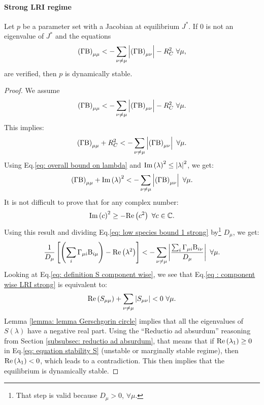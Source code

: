 \documentclass[12pt, titlepage]{report}
\begin{document}
\paragraph{Strong LRI regime}
\begin{theorem}\label{theorem: strong LRI regime}
Let $p$ be a parameter set with a Jacobian at equilibrium $J^*$. If $0$ is not an eigenvalue of $J^*$ and the equations
\begin{equation}
\left(\Gamma \text{B}\right)_{\mu\mu} < - \sum_{\nu \neq \mu } \left|{\left(\Gamma \text{B}\right)_{\mu \nu}}\right| - R_C^2 \ \forall \mu, \label{eq: strong LRI regime}
\end{equation}
are verified, then $p$ is dynamically stable.
\end{theorem}
\begin{proof}
We assume
\begin{equation}
\left(\Gamma \text{B}\right)_{\mu\mu} < - \sum_{\nu \neq \mu } \left|{\left(\Gamma \text{B}\right)_{\mu \nu}}\right| -R_C^2 \ \forall \mu.
\end{equation}
This implies:
\begin{equation}
\left(\Gamma \text{B}\right)_{\mu\mu} + R_C^2< - \sum_{\nu \neq \mu } \left|{\left(\Gamma \text{B}\right)_{\mu \nu}}\right| \ \forall \mu.
\end{equation}
Using Eq.\eqref{eq: overall bound on lambda} and $\text{Im}\left(\lambda\right)^2 \leq \left|{\lambda}\right|^2$, we get:
\begin{equation}
  \left(\Gamma\text{B} \right)_{\mu\mu} + \text{Im}\left(\lambda\right)^2 < - \sum_{\nu \neq \mu } \left|{\left(\Gamma \text{B}\right)_{\mu \nu}}\right| \ \forall \mu. \label{eq: low species bound 1 strong}
\end{equation}
It is not difficult to prove that for any complex number:
\begin{equation}
\imag{c}^2 \geq - \real{c^2} \ \forall c \in \mathbb{C}.
\end{equation}
Using this result and dividing Eq.\eqref{eq: low species bound 1 strong} by\footnote{That step is valid because $D_\mu > 0$, $\forall \mu$.} $D_\mu$, we get:
\begin{equation}
\frac{1}{D_\mu}\left[\left(\sum_i \Gamma_{\mu i} \text{B}_{i \mu} \right)-\text{Re}\left(\lambda^2\right)\right] < - \sum_{\nu \neq \mu } \left|{\frac{\sum_i \Gamma_{\mu i}\text{B}_{i\nu}}{D_\mu}}\right| \ \forall \mu. \label{eq : component wise LRI strong}
\end{equation}
Looking at Eq.\eqref{eq: definition S component wise}, we see that Eq.\eqref{eq : component wise LRI strong} is equivalent to:
\begin{equation}
\text{Re}\left(S_{\mu \mu}\right) + \sum_{\nu \neq \mu} \left|{S_{\mu \nu}}\right| < 0\ \forall \mu.
\end{equation}
Lemma \ref{lemma: lemma Gerschgorin circle} implies that all the eigenvalues of $S(\lambda)$ have a negative real part.
Using the ``Reductio ad absurdum'' reasoning from Section \ref{subsubsec: reductio ad absurdum}, that means that if $\text{Re}\left(\lambda_1\right) \geq 0 $ in Eq.\eqref{eq: equation stability S} (unstable or marginally stable regime), then $\text{Re}\left(\lambda_1\right) < 0$, which leads to a contradiction. This then implies that the equilibrium is dynamically stable.
\end{proof}
\end{document}

